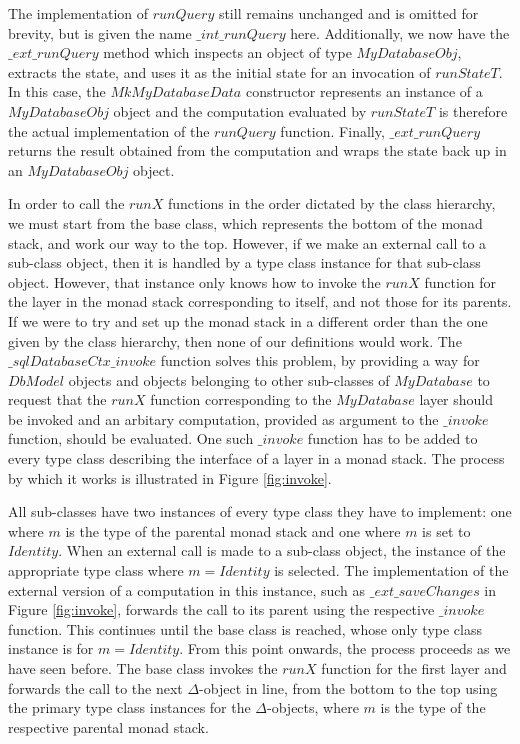 The implementation of $\mathit{runQuery}$ still remains unchanged and is omitted for brevity, but is given the name $\mathit{\_int\_runQuery}$ here. Additionally, we now have the $\mathit{\_ext\_runQuery}$ method which inspects an object of type $\mathit{MyDatabaseObj}$, extracts the state, and uses it as the initial state for an invocation of $\mathit{runStateT}$. In this case, the $\mathit{MkMyDatabaseData}$ constructor represents an instance of a $\mathit{MyDatabaseObj}$ object and the computation evaluated by $\mathit{runStateT}$ is therefore the actual implementation of the $\mathit{runQuery}$ function. Finally, $\mathit{\_ext\_runQuery}$ returns the result obtained from the computation and wraps the state back up in an $\mathit{MyDatabaseObj}$ object.

In order to call the $\mathit{runX}$ functions in the order dictated by the class hierarchy, we must start from the base class, which represents the bottom of the monad stack, and work our way to the top. However, if we make an external call to a sub-class object, then it is handled by a type class instance for that sub-class object. However, that instance only knows how to invoke the $\mathit{runX}$ function for the layer in the monad stack corresponding to itself, and not those for its parents. If we were to try and set up the monad stack in a different order than the one given by the class hierarchy, then none of our definitions would work. The $\_\mathit{sqlDatabaseCtx\_invoke}$ function solves this problem, by providing a way for $\mathit{DbModel}$ objects and objects belonging to other sub-classes of $\mathit{MyDatabase}$ to request that the $\mathit{runX}$ function corresponding to the $\mathit{MyDatabase}$ layer should be invoked and an arbitary computation, provided as argument to the $\_\mathit{invoke}$ function, should be evaluated.  One such $\_\mathit{invoke}$ function has to be added to every type class describing the interface of a layer in a monad stack. The process by which it works is illustrated in Figure \ref{fig:invoke}. 

All sub-classes have two instances of every type class they have to implement: one where $m$ is the type of the parental monad stack and one where $m$ is set to $\mathit{Identity}$. When an external call is made to a sub-class object, the instance of the appropriate type class where $m = \mathit{Identity}$ is selected. The implementation of the external version of a computation in this instance, such as $\_\mathit{ext}\_\mathit{saveChanges}$ in Figure \ref{fig:invoke}, forwards the call to its parent using the respective $\_\mathit{invoke}$ function. This continues until the base class is reached, whose only type class instance is for $m = \mathit{Identity}$. From this point onwards, the process proceeds as we have seen before. The base class invokes the $\mathit{runX}$ function for the first layer and forwards the call to the next $\Delta$-object in line, from the bottom to the top using the primary type class instances for the $\Delta$-objects, where $m$ is the type of the respective parental monad stack. 

